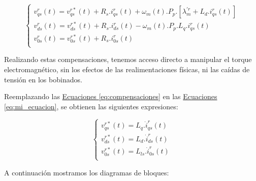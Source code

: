 \documentclass{article}
\begin{document}
\begin{equation}\label{eq:compensaciones}
    \begin{cases}
        v^r_{qs}(t) = v^{r*}_{qs}(t) + R_{s}.i_{qs}^r(t) + \omega_m(t).P_p.[\lambda^{\prime r}_m + L_d.i_{qs}^r(t)] \\
        v^r_{ds}(t) = v^{r*}_{ds}(t) + R_{s}.i_{ds}^r(t) - \omega_m(t).P_p.L_q.i_{qs}^r(t) \\
        v^r_{0s}(t) = v^{r*}_{0s}(t) + R_{s}.i_{0s}^r(t) \\
    \end{cases}
\end{equation}

Realizando estas compensaciones, tenemos acceso directo a manipular el torque electromagnético, 
sin los efectos de las realimentaciones físicas, ni las caídas de tensión en los bobinados.

Reemplazando las \hyperref[eq:compensaciones]{Ecuaciones \ref*{eq:compensaciones}} en las
\hyperref[eq:mi_ecuacion]{Ecuaciones \ref*{eq:mi_ecuacion}}, se obtienen las siguientes expresiones:

\begin{equation}\label{eq:proporcionlaidad_corrientes_tensiones_de_entrada}
    \begin{cases}
        v^{r*}_{qs}(t) = L_q. \dot{i}_{qs}^r(t) \\
        v^{r*}_{ds}(t) = L_d. \dot{i}_{ds}^r(t) \\
        v^{r*}_{0s}(t) = L_{ls}. \dot{i}_{0s}^r(t) \\
    \end{cases}
\end{equation}

A continuación mostramos los diagramas de bloques: 
\end{document}
